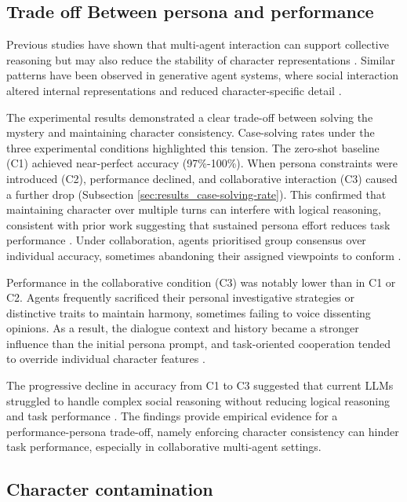 \documentclass{article}
\begin{document}
\subsection{Trade off Between persona and performance}

Previous studies have shown that multi-agent interaction can support collective reasoning but may also reduce the stability of character representations \citep{baltaji2024cultured, choi2024examining}. Similar patterns have been observed in generative agent systems, where social interaction altered internal representations and reduced character-specific detail \citep{xiao2023simulating}.

The experimental results demonstrated a clear trade-off between solving the mystery and maintaining character consistency. Case-solving rates under the three experimental conditions highlighted this tension. The zero-shot baseline (C1) achieved near-perfect accuracy (97\%-100\%). When persona constraints were introduced (C2), performance declined, and collaborative interaction (C3) caused a further drop (Subsection \ref{sec:results_case-solving-rate}). This confirmed that maintaining character over multiple turns can interfere with logical reasoning, consistent with prior work suggesting that sustained persona effort reduces task performance \citep{shao2023characterllm, xiao2023simulating, xiao2023simulating}. Under collaboration, agents prioritised group consensus over individual accuracy, sometimes abandoning their assigned viewpoints to conform \citep{baltaji2024cultured}.

Performance in the collaborative condition (C3) was notably lower than in C1 or C2. Agents frequently sacrificed their personal investigative strategies or distinctive traits to maintain harmony, sometimes failing to voice dissenting opinions. As a result, the dialogue context and history became a stronger influence than the initial persona prompt, and task-oriented cooperation tended to override individual character features \citep{shanahan2023role, xiao2023simulating, chen2024socialbench}.

The progressive decline in accuracy from C1 to C3 suggested that current LLMs struggled to handle complex social reasoning without reducing logical reasoning and task performance \citep{ji2025enhancing}. The findings provide empirical evidence for a performance-persona trade-off, namely enforcing character consistency can hinder task performance, especially in collaborative multi-agent settings.

\subsection{Character contamination}
\end{document}
